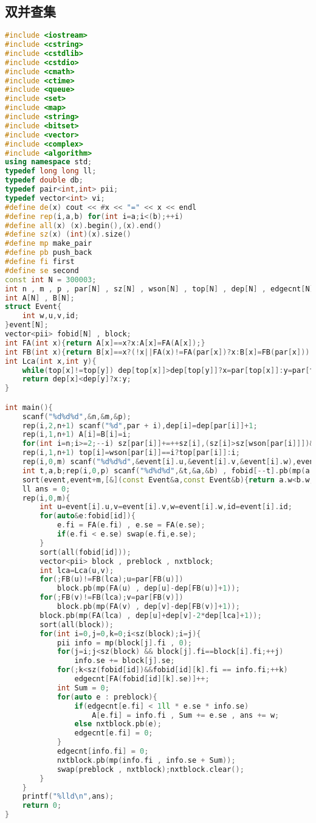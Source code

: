 \subsection{双并查集}
\begin{lstlisting}[language=C++]
#include <iostream>
#include <cstring>
#include <cstdlib>
#include <cstdio>
#include <cmath>
#include <ctime>
#include <queue>
#include <set>
#include <map>
#include <string>
#include <bitset>
#include <vector>
#include <complex>
#include <algorithm>
using namespace std;
typedef long long ll;
typedef double db;
typedef pair<int,int> pii;
typedef vector<int> vi;
#define de(x) cout << #x << "=" << x << endl
#define rep(i,a,b) for(int i=a;i<(b);++i)
#define all(x) (x).begin(),(x).end()
#define sz(x) (int)(x).size()
#define mp make_pair
#define pb push_back
#define fi first
#define se second
const int N = 300003;
int n , m , p , par[N] , sz[N] , wson[N] , top[N] , dep[N] , edgecnt[N];
int A[N] , B[N];
struct Event{
    int w,u,v,id;
}event[N];
vector<pii> fobid[N] , block;
int FA(int x){return A[x]==x?x:A[x]=FA(A[x]);}
int FB(int x){return B[x]==x?(!x||FA(x)!=FA(par[x])?x:B[x]=FB(par[x])):B[x]=FB(B[x]);}
int Lca(int x,int y){
    while(top[x]!=top[y]) dep[top[x]]>dep[top[y]]?x=par[top[x]]:y=par[top[y]];
    return dep[x]<dep[y]?x:y;
}

int main(){
    scanf("%d%d%d",&n,&m,&p);
    rep(i,2,n+1) scanf("%d",par + i),dep[i]=dep[par[i]]+1;
    rep(i,1,n+1) A[i]=B[i]=i;
    for(int i=n;i>=2;--i) sz[par[i]]+=++sz[i],(sz[i]>sz[wson[par[i]]])&&(wson[par[i]]=i);
    rep(i,1,n+1) top[i]=wson[par[i]]==i?top[par[i]]:i;
    rep(i,0,m) scanf("%d%d%d",&event[i].u,&event[i].v,&event[i].w),event[i].id=i;
    int t,a,b;rep(i,0,p) scanf("%d%d%d",&t,&a,&b) , fobid[--t].pb(mp(a,b));
    sort(event,event+m,[&](const Event&a,const Event&b){return a.w<b.w;});
    ll ans = 0;
    rep(i,0,m){
        int u=event[i].u,v=event[i].v,w=event[i].w,id=event[i].id;
        for(auto&e:fobid[id]){
            e.fi = FA(e.fi) , e.se = FA(e.se);
            if(e.fi < e.se) swap(e.fi,e.se);
        }
        sort(all(fobid[id]));
        vector<pii> block , preblock , nxtblock;
        int lca=Lca(u,v);
        for(;FB(u)!=FB(lca);u=par[FB(u)])
            block.pb(mp(FA(u) , dep[u]-dep[FB(u)]+1));
        for(;FB(v)!=FB(lca);v=par[FB(v)])
            block.pb(mp(FA(v) , dep[v]-dep[FB(v)]+1));
        block.pb(mp(FA(lca) , dep[u]+dep[v]-2*dep[lca]+1));
        sort(all(block));
        for(int i=0,j=0,k=0;i<sz(block);i=j){
            pii info = mp(block[j].fi , 0);
            for(j=i;j<sz(block) && block[j].fi==block[i].fi;++j)
                info.se += block[j].se;
            for(;k<sz(fobid[id])&&fobid[id][k].fi == info.fi;++k)
                edgecnt[FA(fobid[id][k].se)]++;
            int Sum = 0;
            for(auto e : preblock){
                if(edgecnt[e.fi] < 1ll * e.se * info.se)
                    A[e.fi] = info.fi , Sum += e.se , ans += w;
                else nxtblock.pb(e);
                edgecnt[e.fi] = 0;
            }
            edgecnt[info.fi] = 0;
            nxtblock.pb(mp(info.fi , info.se + Sum));
            swap(preblock , nxtblock);nxtblock.clear();
        }
    }
    printf("%lld\n",ans);
    return 0;
}
\end{lstlisting}
